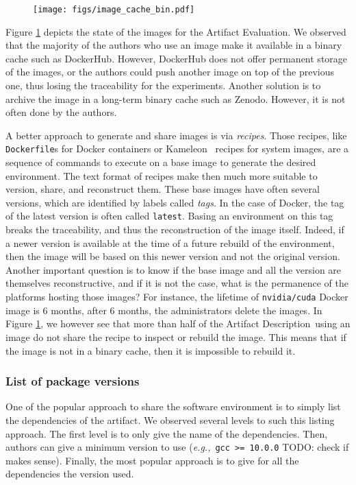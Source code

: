 \documentclass[sigconf]{acmart}
\newcommand{\eg}{\emph{e.g.,}}
\newcommand{\ad}{Artifact Description}
\newcommand{\aeval}{Artifact Evaluation}
\newcommand{\todo}[1]{{\color{red}TODO: #1}}
\begin{document}
\begin{figure}
  \centering
    \texttt{[image: figs/image\_cache\_bin.pdf]}
  \caption{}\label{fig:cache_bin}
\end{figure}

Figure \ref{fig:cache_bin} depicts the state of the images for the \aeval.
We observed that the majority of the authors who use an image make it available in a binary cache such as DockerHub. 
However, DockerHub does not offer permanent storage of the images, or the authors could push another image on top of the previous one, thus losing the traceability for the experiments.
Another solution is to archive the image in a long-term binary cache such as Zenodo.
However, it is not often done by the authors.

A better approach to generate and share images is via \emph{recipes}.
Those recipes, like \texttt{Dockerfile}s for Docker containers or Kameleon\ \cite{ruiz_reconstructable_2015} recipes for system images, are a sequence of commands to execute on a base image to generate the desired environment.
The text format of recipes make then much more suitable to version, share, and reconstruct them.
These base images have often several versions, which are identified by labels called \emph{tags}.
In the case of Docker, the tag of the latest version is often called \texttt{latest}.
Basing an environment on this tag breaks the traceability, and thus the reconstruction of the image itself.
Indeed, if a newer version is available at the time of a future rebuild of the environment, then the image will be based on this newer version and not the original version.
Another important question is to know if the base image and all the version are themselves reconstructive, and if it is not the case, what is the permanence of the platforms hosting those images?
For instance, the lifetime of \texttt{nvidia/cuda} Docker image is 6 months, after 6 months, the administrators delete the images.
In Figure \ref{fig:cache_bin}, we however see that more than half of the \ad\ using an image do not share the recipe to inspect or rebuild the image.
This means that if the image is not in a binary cache, then it is impossible to rebuild it.



\subsubsection{List of package versions}\label{sec:sop:sw:list}

One of the popular approach to share the software environment is to simply list the dependencies of the artifact.
We observed several levels to such this listing approach.
The first level is to only give the name of the dependencies.
Then, authors can give a minimum version to use (\eg\ \texttt{gcc >= 10.0.0} \todo{check if makes sense}).
Finally, the most popular approach is to give for all the dependencies the version used.
\end{document}
